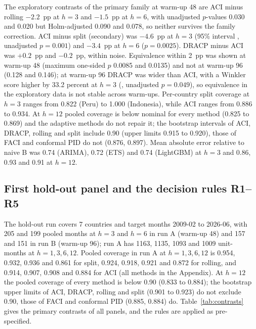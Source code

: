\begin{table}[t]
\centering
\caption{Calibration error by base model, interval method and horizon, first hold-out panel (7 countries, warm-up 48).}
\label{tab:ce_ho1}
\small
\fittable{}
\end{table}

The exploratory contrasts of the primary family at warm-up 48 are ACI minus rolling $-2.2$~pp at $h=3$ and $-1.5$~pp at $h=6$, with unadjusted $p$-values 0.030 and 0.020 but Holm-adjusted 0.090 and 0.078, so neither survives the family correction. ACI minus split (secondary) was $-4.6$~pp at $h=3$ (95\% interval , unadjusted $p=0.001$) and $-3.4$~pp at $h=6$ ($p=0.0025$). DRACP minus ACI was $+0.2$~pp and $-0.2$~pp, within noise. Equivalence within 2~pp was shown at warm-up 48 (maximum one-sided $p$ 0.0085 and 0.0135) and not at warm-up 96 (0.128 and 0.146); at warm-up 96 DRACP was wider than ACI, with a Winkler score higher by 33.2 percent at $h=3$ (, unadjusted $p=0.049$), so equivalence in the exploratory data is not stable across warm-ups. Per-country split coverage at $h=3$ ranges from 0.822 (Peru) to 1.000 (Indonesia), while ACI ranges from 0.886 to 0.934. At $h=12$ pooled coverage is below nominal for every method (0.825 to 0.869) and the adaptive methods do not repair it; the bootstrap intervals of ACI, DRACP, rolling and split include 0.90 (upper limits 0.915 to 0.920), those of FACI and conformal PID do not (0.876, 0.897). Mean absolute error relative to naive B was 0.74 (ARIMA), 0.72 (ETS) and 0.74 (LightGBM) at $h=3$ and 0.86, 0.93 and 0.91 at $h=12$.

\subsection{First hold-out panel and the decision rules R1--R5}\label{sec:holdout}

The hold-out run covers 7 countries and target months 2009-02 to 2026-06, with 205 and 199 pooled months at $h=3$ and $h=6$ in run A (warm-up 48) and 157 and 151 in run B (warm-up 96); run A has 1163, 1135, 1093 and 1009 unit-months at $h=1,3,6,12$. Pooled coverage in run A at $h=1,3,6,12$ is 0.954, 0.932, 0.936 and 0.861 for split, 0.924, 0.918, 0.921 and 0.872 for rolling, and 0.914, 0.907, 0.908 and 0.884 for ACI (all methods in the Appendix). At $h=12$ the pooled coverage of every method is below 0.90 (0.833 to 0.884); the bootstrap upper limits of ACI, DRACP, rolling and split (0.901 to 0.923) do not exclude 0.90, those of FACI and conformal PID (0.885, 0.884) do. Table~\ref{tab:contrasts} gives the primary contrasts of all panels, and the rules are applied as pre-specified.


